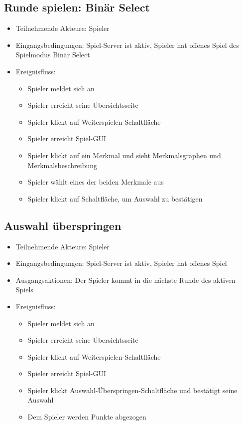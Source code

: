 \documentclass[a4paper]{scrreprt}
\begin{document}
	\subsection{Runde spielen: Binär Select}
	\begin{itemize}
		\item Teilnehmende Akteure: \Gls{Spieler}
		\item Eingangsbedingungen: Spiel-Server ist aktiv, \Gls{Spieler} hat offenes Spiel des \Gls{Spielmodus} Binär Select
		\item Ereignisfluss:
		\begin{itemize}
			\item \Gls{Spieler} meldet sich an
			\item \Gls{Spieler} erreicht seine Übersichtsseite
			\item \Gls{Spieler} klickt auf Weiterspielen-Schaltfläche
			\item \Gls{Spieler} erreicht Spiel-GUI
			\item \Gls{Spieler} klickt auf ein Merkmal und sieht Merkmalsgraphen und Merkmalsbeschreibung
			\item \Gls{Spieler} wählt eines der beiden Merkmale aus
			\item \Gls{Spieler} klickt auf Schaltfläche, um Auswahl zu bestätigen
		\end{itemize}
	\end{itemize}

	\subsection{Auswahl überspringen}
	\begin{itemize}
		\item Teilnehmende Akteure: \Gls{Spieler}
		\item Eingangsbedingungen: Spiel-Server ist aktiv, \Gls{Spieler} hat offenes Spiel
        \item Ausgangsaktionen: Der \Gls{Spieler} kommt in die nächste Runde des aktiven Spiels
		\item Ereignisfluss:
		\begin{itemize}
			\item \Gls{Spieler} meldet sich an
			\item \Gls{Spieler} erreicht seine Übersichtsseite
			\item \Gls{Spieler} klickt auf Weiterspielen-Schaltfläche
			\item \Gls{Spieler} erreicht Spiel-GUI
			\item \Gls{Spieler} klickt Auswahl-Überspringen-Schaltfläche und bestätigt seine Auswahl
            \item Dem \Gls{Spieler} werden Punkte abgezogen
		\end{itemize}
	\end{itemize}
     
\end{document}
